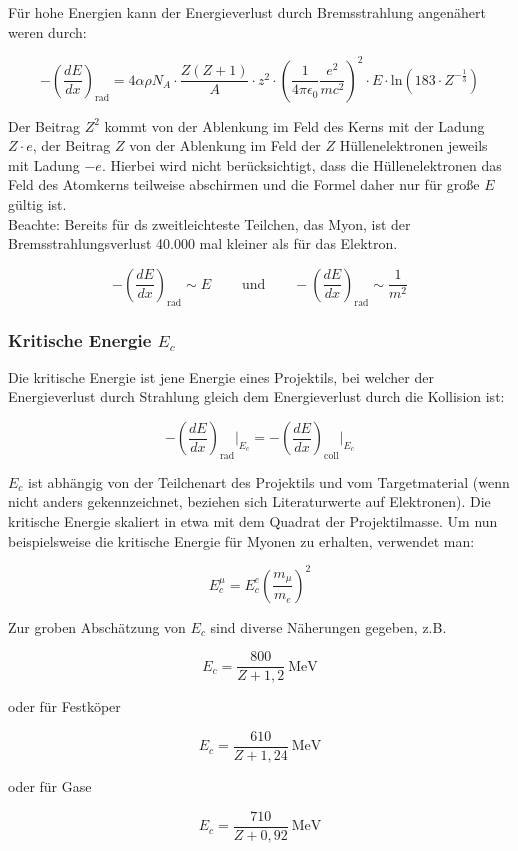 Für hohe Energien kann der Energieverlust durch Bremsstrahlung angenähert weren durch:

\[-\left(\frac{dE}{dx}\right)_{\text{rad}} = 4\alpha \rho N_A \cdot \frac{Z(Z+1)}{A} \cdot z^2\cdot
\left(\frac{1}{4\pi \epsilon_0} \frac{e^2}{mc^2} \right)^2 \cdot E\cdot \text{ln}(183\cdot
Z^{-\frac{1}{3}}) \]

Der Beitrag $Z^2$ kommt von der Ablenkung im Feld des Kerns mit der Ladung $Z\cdot e$, der Beitrag
$Z$ von der Ablenkung im Feld der $Z$ Hüllenelektronen jeweils mit Ladung $-e$. Hierbei wird nicht
berücksichtigt, dass die Hüllenelektronen das Feld des Atomkerns teilweise abschirmen und die Formel
daher nur für große $E$ gültig ist.
\\
Beachte: Bereits für ds zweitleichteste Teilchen, das Myon, ist der Bremsstrahlungsverlust 40.000
mal kleiner als für das Elektron. 

\[-\left(\frac{dE}{dx}\right)_{\text{rad}} \sim E~~~~~~~~~~\text{und}~~~~~~~~~
-\left(\frac{dE}{dx}\right)_{\text{rad}} \sim \frac{1}{m^2}\]

\subsubsection*{Kritische Energie $E_c$}

Die kritische Energie ist jene Energie eines Projektils, bei welcher der Energieverlust durch
Strahlung gleich dem Energieverlust durch die Kollision ist:

\[-\left(\frac{dE}{dx}\right)_{\text{rad}} \bigg|_{E_c} = -\left(\frac{dE}{dx}\right)_{\text{coll}}
\bigg|_{E_c}  \]

$E_c$ ist abhängig von der Teilchenart des Projektils und vom Targetmaterial (wenn nicht anders
gekennzeichnet, beziehen sich Literaturwerte auf Elektronen). Die kritische Energie skaliert in etwa
mit dem Quadrat der Projektilmasse. Um nun beispielsweise die kritische Energie für Myonen zu
erhalten, verwendet man:

\[E_c^\mu = E_c^e \left( \frac{m_\mu}{m_e} \right)^2 \]

Zur groben Abschätzung von $E_c$ sind diverse Näherungen gegeben, z.B.

\[E_c = \frac{800}{Z+1{},2}~\text{MeV} \]

oder für Festköper

\[E_c = \frac{610}{Z+1{,}24}~\text{MeV} \]

oder für Gase

\[E_c = \frac{710}{Z+0{,}92}~\text{MeV} \]


